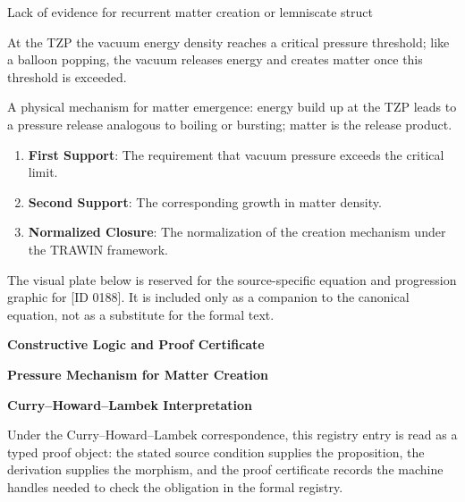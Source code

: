 Lack of evidence for recurrent matter creation or lemniscate struct

At the TZP the vacuum energy density reaches a critical pressure threshold; like a balloon popping, the vacuum releases energy and creates matter once this threshold is exceeded.  

A physical mechanism for matter emergence: energy build up at the TZP leads to a pressure release analogous to boiling or bursting; matter is the release product.  
\endgroup

\begin{enumerate}[leftmargin=1.6em,itemsep=6pt,topsep=4pt]
\item \textbf{First Support}: The requirement that vacuum pressure exceeds the critical limit.
\item \textbf{Second Support}: The corresponding growth in matter density.
\item \textbf{Normalized Closure}: The normalization of the creation mechanism under the TRAWIN framework.
\end{enumerate}

\begingroup\footnotesize\sloppy
The visual plate below is reserved for the source-specific equation and progression graphic for [ID 0188]. It is included only as a companion to the canonical equation, not as a substitute for the formal text.
\par\endgroup
\ifTZPDarkEdition
{}
\fi

\clearpage
\begingroup\tzpsupportsetup
\noindent\textbf{\fontsize{10.8pt}{12.8pt}\selectfont [ID 0188] Constructive Logic and Proof Certificate}\par
\noindent\textbf{\fontsize{10pt}{12pt}\selectfont Pressure Mechanism for Matter Creation}\par
\vspace{0.45em}
\begingroup
\footnotesize
\setlength{\parskip}{0.22em}
\setlength{\parindent}{0pt}
\noindent\textbf{Curry--Howard--Lambek Interpretation}\par
Under the Curry--Howard--Lambek correspondence, this registry entry is read as a typed proof
object: the stated source condition supplies the proposition, the derivation supplies the
morphism, and the proof certificate records the machine handles needed to check the obligation
in the formal registry.

